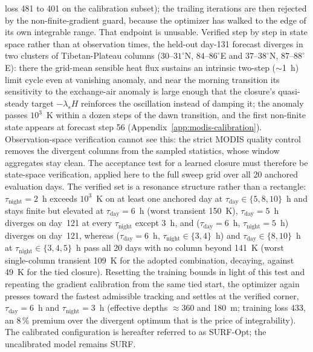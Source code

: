loss 481 to 401 on the calibration subset); the trailing iterations are
then rejected by the non-finite-gradient guard, because the optimizer has
walked
to the edge of its own integrable range. That endpoint is unusable.
Verified step by step in state space rather than at observation times, the
held-out day-131 forecast diverges in two clusters of Tibetan-Plateau
columns ($30$--$31^\circ$N, $84$--$86^\circ$E and $37$--$38^\circ$N,
$87$--$88^\circ$E): there the grid-mean sensible heat
flux sustains an intrinsic two-step ($\sim$1~h) limit cycle even at
vanishing anomaly, and near the morning transition its sensitivity to the
exchange-air anomaly is large enough
that the closure's quasi-steady target $-\lambda_s H$ reinforces the
oscillation instead of damping it; the anomaly passes $10^{3}$~K within a
dozen steps of the dawn transition, and the first non-finite state appears
at forecast step 56 (Appendix~\ref{app:modis-calibration}).
Observation-space verification cannot see this: the strict MODIS quality
control removes the divergent columns from the sampled statistics, whose
window aggregates stay clean. The acceptance test for a learned closure
must therefore be state-space verification, applied here to the full sweep
grid over all 20 anchored evaluation days. The verified set is a resonance
structure rather than a rectangle: $\tau_{\mathrm{night}} = 2$~h
exceeds $10^{3}$~K on at least one anchored day at
$\tau_{\mathrm{day}} \in \{5, 8, 10\}$~h and stays finite but elevated at
$\tau_{\mathrm{day}} = 6$~h (worst transient 150~K), $\tau_{\mathrm{day}} =
5$~h diverges on day~121 at every $\tau_{\mathrm{night}}$ except 3~h, and
($\tau_{\mathrm{day}} = 6$~h, $\tau_{\mathrm{night}} = 5$~h) diverges on
day~121, whereas ($\tau_{\mathrm{day}} = 6$~h, $\tau_{\mathrm{night}} \in
\{3, 4\}$~h) and $\tau_{\mathrm{day}} \in \{8, 10\}$~h at
$\tau_{\mathrm{night}} \in \{3, 4, 5\}$~h pass
all 20 days with no column beyond 141~K (worst single-column
transient 109~K for the adopted combination, decaying, against 49~K for
the tied closure). Resetting
the training bounds in light of this test and repeating the gradient
calibration from the same tied start, the optimizer again presses toward
the fastest admissible tracking and settles at the verified corner,
$\tau_{\mathrm{day}} = 6$~h and $\tau_{\mathrm{night}} = 3$~h (effective
depths $\approx$360 and 180~m; training loss 433, an 8\,\% premium over
the divergent optimum that is the price of integrability). The calibrated
configuration is hereafter referred to as SURF-Opt; the uncalibrated model
remains SURF.

